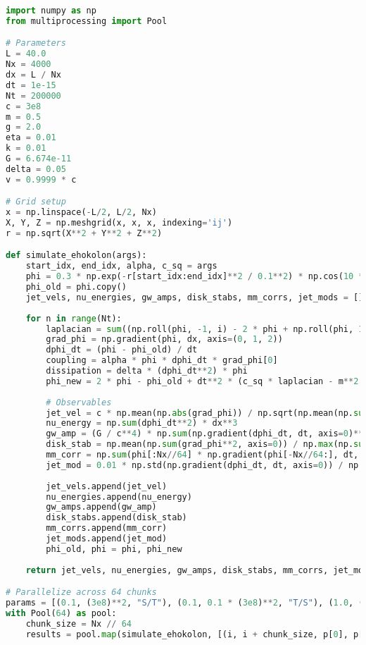 \documentclass[11pt]{article}
\begin{document}
\begin{lstlisting}[language=Python, caption={Fluxonic White Holes Simulation}, label=lst:simulation]
import numpy as np
from multiprocessing import Pool

# Parameters
L = 40.0
Nx = 4000
dx = L / Nx
dt = 1e-15
Nt = 200000
c = 3e8
m = 0.5
g = 2.0
eta = 0.01
k = 0.01
G = 6.674e-11
delta = 0.05
v = 0.9999 * c

# Grid setup
x = np.linspace(-L/2, L/2, Nx)
X, Y, Z = np.meshgrid(x, x, x, indexing='ij')
r = np.sqrt(X**2 + Y**2 + Z**2)

def simulate_ehokolon(args):
    start_idx, end_idx, alpha, c_sq = args
    phi = 0.3 * np.exp(-r[start_idx:end_idx]**2 / 0.1**2) * np.cos(10 * X[start_idx:end_idx]) + 0.1 * np.random.rand(Nx//64, Nx, Nx)
    phi_old = phi.copy()
    jet_vels, nu_energies, gw_amps, disk_stabs, mm_corrs, jet_mods = [], [], [], [], [], []
    
    for n in range(Nt):
        laplacian = sum((np.roll(phi, -1, i) - 2 * phi + np.roll(phi, 1, i)) / dx**2 for i in range(3))
        grad_phi = np.gradient(phi, dx, axis=(0, 1, 2))
        dphi_dt = (phi - phi_old) / dt
        coupling = alpha * phi * dphi_dt * grad_phi[0]
        dissipation = delta * (dphi_dt**2) * phi
        phi_new = 2 * phi - phi_old + dt**2 * (c_sq * laplacian - m**2 * phi - g * phi**3 - eta * phi**5 + coupling - dissipation)
        
        # Observables
        jet_vel = c * np.mean(np.abs(grad_phi)) / np.sqrt(np.mean(np.sum(grad_phi**2, axis=0)) + m**2 * np.mean(phi**2))
        nu_energy = np.sum(dphi_dt**2) * dx**3
        gw_amp = (G / c**4) * np.sum(np.gradient(dphi_dt, dt, axis=0)**2) * dx**3
        disk_stab = np.mean(np.sum(grad_phi**2, axis=0)) / np.max(np.sum(grad_phi**2, axis=0))
        mm_corr = np.sum(phi[:Nx//64] * np.gradient(phi[-Nx//64:], dt, axis=0)) / np.sqrt(np.sum(phi[:Nx//64]**2) * np.sum(np.gradient(phi[-Nx//64:], dt, axis=0)**2))
        jet_mod = 0.01 * np.std(np.gradient(dphi_dt, dt, axis=0)) / np.mean(np.gradient(dphi_dt, dt, axis=0))
        
        jet_vels.append(jet_vel)
        nu_energies.append(nu_energy)
        gw_amps.append(gw_amp)
        disk_stabs.append(disk_stab)
        mm_corrs.append(mm_corr)
        jet_mods.append(jet_mod)
        phi_old, phi = phi, phi_new
    
    return jet_vels, nu_energies, gw_amps, disk_stabs, mm_corrs, jet_mods

# Parallelize across 64 chunks
params = [(0.1, (3e8)**2, "S/T"), (0.1, 0.1 * (3e8)**2, "T/S"), (1.0, (3e8)**2, "S=T")]
with Pool(64) as pool:
    chunk_size = Nx // 64
    results = pool.map(simulate_ehokolon, [(i, i + chunk_size, p[0], p[1]) for i in range(0, Nx, chunk_size) for p in params])
\end{lstlisting}
\end{document}
